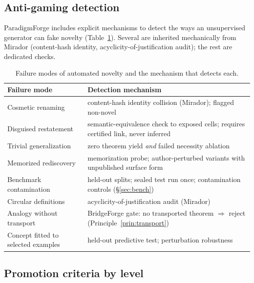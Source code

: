 \documentclass[11pt]{article}
\theoremstyle{definition}
\theoremstyle{remark}
\newcommand{\PF}{ParadigmForge}
\begin{document}
\subsection{Anti-gaming detection}

\PF{} includes explicit mechanisms to detect the ways an unsupervised generator can fake novelty
(Table~\ref{tab:antigaming}). Several are inherited mechanically from Mirador (content-hash identity,
acyclicity-of-justification audit); the rest are dedicated checks.

\begin{table}[t]
\centering
\small
\caption{Failure modes of automated novelty and the mechanism that detects each.}
\label{tab:antigaming}
\begin{tabular}{p{} p{}}
\toprule
\textbf{Failure mode} & \textbf{Detection mechanism} \\
\midrule
Cosmetic renaming & content-hash identity collision (Mirador); flagged non-novel \\
Disguised restatement & semantic-equivalence check to exposed cells; requires certified link, never
inferred \\
Trivial generalization & zero theorem yield \emph{and} failed necessity ablation \\
Memorized rediscovery & memorization probe; author-perturbed variants with unpublished surface form \\
Benchmark contamination & held-out splits; sealed test run once; contamination controls
(\S\ref{sec:bench}) \\
Circular definitions & acyclicity-of-justification audit (Mirador) \\
Analogy without transport & BridgeForge gate: no transported theorem $\Rightarrow$ reject
(Principle~\ref{prin:transport}) \\
Concept fitted to selected examples & held-out predictive test; perturbation robustness \\
\bottomrule
\end{tabular}
\end{table}

\subsection{Promotion criteria by level}
\end{document}
